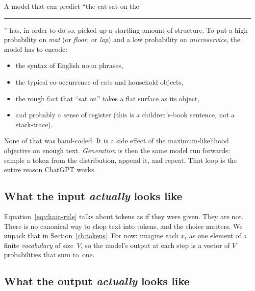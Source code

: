 A model that can predict ``the cat sat on the \rule{1cm}{0.4pt}'' has, in
order to do so, picked up a startling amount of structure. To put a high
probability on \emph{mat} (or \emph{floor}, or \emph{lap}) and a low
probability on \emph{microservice}, the model has to encode:

\begin{itemize}
\item the syntax of English noun phrases,
\item the typical co-occurrence of cats and household objects,
\item the rough fact that ``sat on'' takes a flat surface as its object,
\item and probably a sense of register (this is a children's-book sentence,
not a stack-trace).
\end{itemize}

None of that was hand-coded. It is a side effect of the maximum-likelihood
objective on enough text. \emph{Generation} is then the same model run
forwards: sample a token from the distribution, append it, and repeat. That
loop is the entire reason ChatGPT works.

\subsection{What the input \emph{actually} looks like}

Equation~\eqref{eq:chain-rule} talks about tokens as if they were given. They
are not. There is no canonical way to chop text into tokens, and the choice
matters. We unpack that in Section~\ref{ch:tokens}. For now: imagine each
\(x_t\) as one element of a finite \emph{vocabulary} of size~\(V\), so the
model's output at each step is a vector of \(V\) probabilities that sum
to~one.

\subsection{What the output \emph{actually} looks like}


